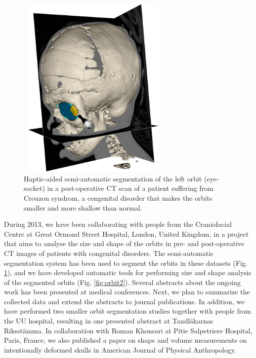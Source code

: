 \begin{enumerate}
{\begin{figure}[!htbp]
\centering
\includegraphics[width=75mm,height=90mm]{figures/research/orbit_project_figure1.png}
\caption{Haptic-aided semi-automatic segmentation of the left orbit (eye-socket) in a post-operative CT scan of a patient suffering from Crouzon syndrom, a congenital disorder that makes the orbits smaller and more shallow than normal.}
\label{fig:orbit1}
\end{figure}

During 2013, we have been collaborating with people from the Craniofacial Centre at Great Ormond Street Hospital, London, United Kingdom, in a project that aims to analyse the size and shape of the orbits in pre- and post-operative CT images of patients with congenital disorders. The semi-automatic segmentation system has been used to segment the orbits in these datasets (Fig. \ref{fig:orbit1}), and we have developed automatic tools for performing size and shape analysis of the segmented orbits (Fig. \ref{fig:orbit2}). Several abstracts about the ongoing work has been presented at medical conferences. Next, we plan to summarize the collected data and extend the abstracts to journal publications. In addition, we have performed two smaller orbit segmentation studies together with people from the UU hospital, resulting in one presented abstract at Tandl\"{a}karnas Riksst\"{a}mma. In collaboration with Roman Khonsari at Pitie Salpetriere Hospital, Paris, France, we also published a paper on shape and volume measurements on intentionally deformed skulls in American Journal of Physical Anthropology.}


\end{enumerate}
